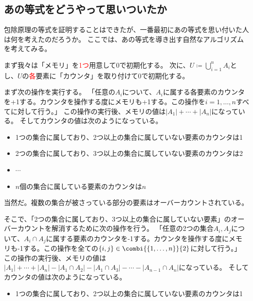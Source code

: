{                \subsection{あの等式をどうやって思いついたか}
                    包除原理の等式を証明することはできたが、一番最初にあの等式を思い付いた人は何を考えたのだろうか。
                    ここでは、あの等式を導き出す自然なアルゴリズムを考えてみる。
                    \par
                    まず我々は「メモリ」を\textcolor{red}{1つ}用意して0で初期化する。
                    次に、$U\coloneq\bigcup_{i=1}^n A_i$とし、$U$の\textcolor{red}{各}要素に「カウンタ」を取り付けて0で初期化する。
                    \par
                    まず次の操作を実行する。
                    「任意の$A_i$について、$A_i$に属する各要素のカウンタを+1する。カウンタを操作する度にメモリも+1する。この操作を$i=1,\dotsc,n$すべてに対して行う。」
                    この操作の実行後、メモリの値は$|A_1|+\dotsb +|A_n|$になっている。
                    そしてカウンタの値は次のようになっている。
                    \begin{itemize}
                        \item 1つの集合に属しており、2つ以上の集合に属していない要素のカウンタは1
                        \item 2つの集合に属しており、3つ以上の集合に属していない要素のカウンタは2
                        \item $\cdots$
                        \item $n$個の集合に属している要素のカウンタは$n$
                    \end{itemize}
                    当然だ。複数の集合が被さっている部分の要素はオーバーカウントされている。
                    \par
                    そこで、「2つの集合に属しており、3つ以上の集合に属していない要素」のオーバーカウントを解消するために次の操作を行う。
                    「任意の2つの集合$A_i,A_j$について、$A_i\cap A_j$に属する要素のカウンタを-1する。カウンタを操作する度にメモリも-1する。この操作を全ての$\{i,j\}\in\combi{\numset}{2}$に対して行う。」
                    この操作の実行後、メモリの値は$|A_1|+\dotsb +|A_n| - |A_1\cap A_2| - |A_1\cap A_3| - \dotsb - |A_{n-1}\cap A_n|$になっている。
                    そしてカウンタの値は次のようになっている。
                    \begin{itemize}
                        \item 1つの集合に属しており、2つ以上の集合に属していない要素のカウンタは1

\end{itemize}}
